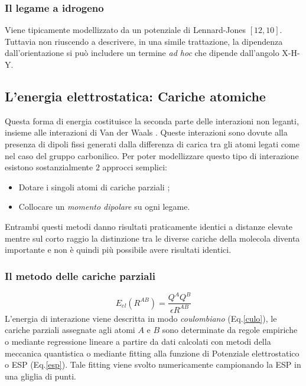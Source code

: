 \documentclass[oneside]{amsbook}
\numberwithin{section}{chapter}
\numberwithin{equation}{section}
\numberwithin{figure}{section}
\begin{document}
\subsubsection{Il legame a idrogeno  \label{mimmo}}
Viene tipicamente modellizzato da un potenziale di Lennard-Jones $[12,10]$. Tuttavia non riuscendo a descrivere, in una simile trattazione, la dipendenza dall'orientazione si può includere un  termine \textit{ad hoc} che dipende dall'angolo X-H-Y.



\subsection{L'energia elettrostatica: Cariche atomiche}
Questa forma di energia costituisce la seconda parte delle interazioni non leganti, insieme alle interazioni di Van der Waals .
Queste interazioni sono dovute alla presenza di dipoli fissi generati dalla differenza di carica tra gli atomi legati come nel caso del gruppo carbonilico.
Per poter modellizzare questo tipo di interazione esistono sostanzialmente $2$ approcci semplici:
\begin{itemize}
\item Dotare i singoli atomi di cariche parziali ;
\item Collocare un \emph{momento dipolare} su ogni legame.
\end{itemize}
Entrambi questi metodi danno risultati praticamente identici a distanze elevate mentre sul corto raggio la distinzione tra le diverse cariche della molecola diventa importante e non è quindi più possibile avere risultati identici.
\subsubsection{Il metodo delle cariche parziali}
\begin{equation}
\label{culo}
E_{el}(R^{AB})= \frac{Q^AQ^B}{\epsilon R^{AB}}
\end{equation}
L'energia di interazione viene descritta in modo \emph{coulombiano} (Eq.\ref{culo}), le cariche parziali assegnate agli atomi $A$ e $B$ sono determinate da regole empiriche o mediante regressione lineare a partire da dati calcolati con metodi della meccanica quantistica o mediante fitting alla funzione di Potenziale elettrostatico o ESP (Eq.\ref{esp}). Tale fitting viene svolto numericamente campionando la ESP in una gliglia di punti.
\end{document}
